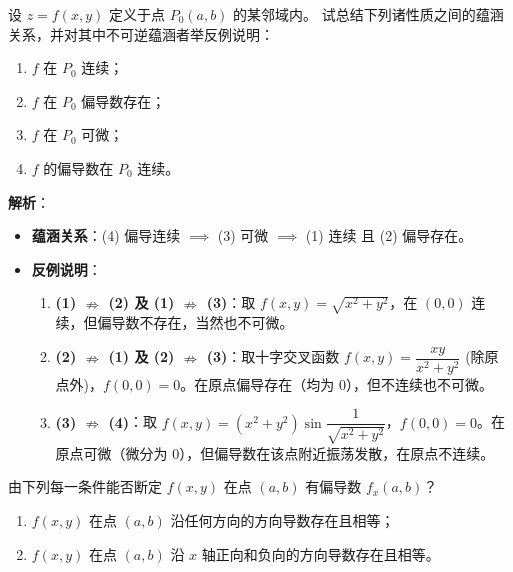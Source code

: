 \documentclass[lang=cn,11pt]{elegantbook}
\begin{document}

\begin{exercise}
设 $z=f(x,y)$ 定义于点 $P_0(a,b)$ 的某邻域内。
试总结下列诸性质之间的蕴涵关系，并对其中不可逆蕴涵者举反例说明：
\begin{enumerate}
  \item[(1)] $f$ 在 $P_0$ 连续；
  \item[(2)] $f$ 在 $P_0$ 偏导数存在；
  \item[(3)] $f$ 在 $P_0$ 可微；
  \item[(4)] $f$ 的偏导数在 $P_0$ 连续。
\end{enumerate}
\end{exercise}

\begin{solution}
\textbf{解析}：
\begin{itemize}
  \item \textbf{蕴涵关系}：(4) 偏导连续 $\implies$ (3) 可微 $\implies$ (1) 连续 且 (2) 偏导存在。
  \item \textbf{反例说明}：
    \begin{enumerate}
      \item \textbf{(1) $\nRightarrow$ (2) 及 (1) $\nRightarrow$ (3)}：取 $f(x,y)=\sqrt{x^2+y^2}$，在 $(0,0)$ 连续，但偏导数不存在，当然也不可微。
      \item \textbf{(2) $\nRightarrow$ (1) 及 (2) $\nRightarrow$ (3)}：取十字交叉函数 $f(x,y) = \dfrac{xy}{x^2+y^2}$ (除原点外)，$f(0,0)=0$。在原点偏导存在（均为 0），但不连续也不可微。
      \item \textbf{(3) $\nRightarrow$ (4)}：取 $f(x,y) = (x^2+y^2)\sin\dfrac{1}{\sqrt{x^2+y^2}}$，$f(0,0)=0$。在原点可微（微分为 $0$），但偏导数在该点附近振荡发散，在原点不连续。
    \end{enumerate}
\end{itemize}
\end{solution}



\begin{exercise}[方向导数与偏导数存在性的关系]
由下列每一条件能否断定 $f(x,y)$ 在点 $(a,b)$ 有偏导数 $f_x(a,b)$？
\begin{enumerate}
  \item $f(x,y)$ 在点 $(a,b)$ 沿任何方向的方向导数存在且相等；
  \item $f(x,y)$ 在点 $(a,b)$ 沿 $x$ 轴正向和负向的方向导数存在且相等。
\end{enumerate}
\end{exercise}
\end{document}
